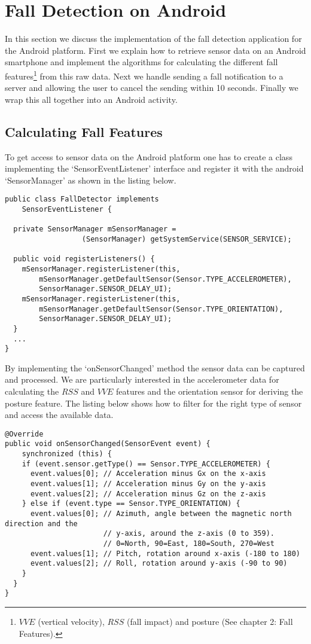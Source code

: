 \documentclass[a4paper, 10pt]{article}
\begin{document}
\section{Fall Detection on Android}
In this section we discuss the implementation of the fall detection application for the Android platform. First we explain how to retrieve sensor data on an Android smartphone and implement the algorithms for calculating the different fall features\footnote{$VVE$ (vertical velocity), $RSS$ (fall impact) and posture (See chapter 2: Fall Features).} from this raw data. Next we handle sending a fall notification to a server and allowing the user to cancel the sending within 10 seconds. Finally we wrap this all together into an Android activity.

\subsection{Calculating Fall Features}
To get access to sensor data on the Android platform one has to create a class implementing the `SensorEventListener' interface and register it with the android `SensorManager' as shown in the listing below.
\begin{lstlisting}
public class FallDetector implements
    SensorEventListener {
    
  private SensorManager mSensorManager = 
                  (SensorManager) getSystemService(SENSOR_SERVICE);
    
  public void registerListeners() {
    mSensorManager.registerListener(this,
        mSensorManager.getDefaultSensor(Sensor.TYPE_ACCELEROMETER),
        SensorManager.SENSOR_DELAY_UI);
    mSensorManager.registerListener(this,
        mSensorManager.getDefaultSensor(Sensor.TYPE_ORIENTATION),
        SensorManager.SENSOR_DELAY_UI);
  }  
  ...  
}
\end{lstlisting}
By implementing the `onSensorChanged' method the sensor data can be captured and processed. We are particularly interested in the accelerometer data for calculating the $RSS$ and $VVE$ features and the orientation sensor for deriving the posture feature. The listing below shows how to filter for the right type of sensor and access the available data.
\begin{lstlisting}
@Override
public void onSensorChanged(SensorEvent event) {
	synchronized (this) {
    if (event.sensor.getType() == Sensor.TYPE_ACCELEROMETER) {
      event.values[0]; // Acceleration minus Gx on the x-axis
      event.values[1]; // Acceleration minus Gy on the y-axis
      event.values[2]; // Acceleration minus Gz on the z-axis
    } else if (event.type == Sensor.TYPE_ORIENTATION) {      
      event.values[0]; // Azimuth, angle between the magnetic north direction and the
                       // y-axis, around the z-axis (0 to 359). 
                       // 0=North, 90=East, 180=South, 270=West
      event.values[1]; // Pitch, rotation around x-axis (-180 to 180)
      event.values[2]; // Roll, rotation around y-axis (-90 to 90)
    }
  }
}
\end{lstlisting}
\end{document}
